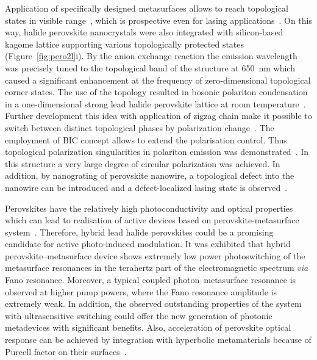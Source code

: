 \documentclass[journal=chreay,manuscript=review]{achemso}
\begin{document}
Application of specifically designed metasurfaces allows to reach topological states in visible range~\cite{lu2014topological}, which is prospective even for lasing applications~\cite{bandres2018topological,zeng2020electrically}. On this way, halide perovskite nanocrystals were also integrated with silicon-based kagome lattice supporting various topologically protected states~\cite{berestennikov2021enhanced} (Figure~\ref{fig:pero2l}i). By the anion exchange reaction the emission wavelength was precisely tuned to the topological band of the structure at 650~nm which caused a significant enhancement at the frequency of zero-dimensional topological corner states. The use of the topology resulted in bosonic polariton condensation in a one-dimensional strong lead halide perovskite lattice at room temperature~\cite{su2020observation}. Further development this idea with application of zigzag chain make it possible to switch between distinct topological phases by polarization change~\cite{su2021optical}. The employment of BIC concept allows to extend the polarisation control. Thus topological polarization singularities in polariton emission was demonstrated~\cite{kim2021topological}. In this structure a very large degree of circular polarization was achieved. In addition, by nanograting of perovskite nanowire, a topological defect into the nanowire can be introduced and a defect-localized lasing state is observed~\cite{berestennikov2020optical}.


Perovskites have the relatively high photoconductivity and optical properties which can lead to realisation of active devices based on perovskite-metasurface system~\cite{manjappa2017hybrid}. Therefore, hybrid lead halide perovskites could be a promising candidate for active photo-induced modulation. It was exhibited that  hybrid perovskite–metasurface device shows extremely low power photoswitching of the metasurface resonances in the terahertz part of the electromagnetic spectrum \textit{via} Fano resonance. Moreover, a typical coupled photon–metasurface resonance is observed at higher pump powers, where the Fano resonance amplitude is extremely weak. In addition, the observed outstanding properties of the system with ultrasensitive switching could offer the new generation of photonic metadevices with significant benefits. Also, acceleration of perovskite optical response can be achieved by integration with hyperbolic metamaterials because of Purcell factor on their surfaces~\cite{adl2020purcell, li2020active, tonkaev2021acceleration}.
\end{document}
